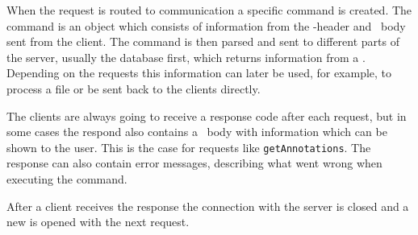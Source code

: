 When the request is routed to communication a specific command is
created. The command is an object which consists of information from
the -header and \json\ body sent from the
client. The command is then parsed and sent to different parts of the
server, usually the database first, which returns information from a
. Depending on the requests this information can later
be used, for example, to process a file or be sent back to the clients
directly.

The clients are always going to receive a response code after each
request, but in some cases the respond also contains a \json\ body
 with information which can be shown to the user. This is the case
for requests like \texttt{getAnnotations}. The response can also contain
error messages, describing what went wrong when executing the command.

After a client receives the response the connection with the server is
closed and a new is opened with the next request.
